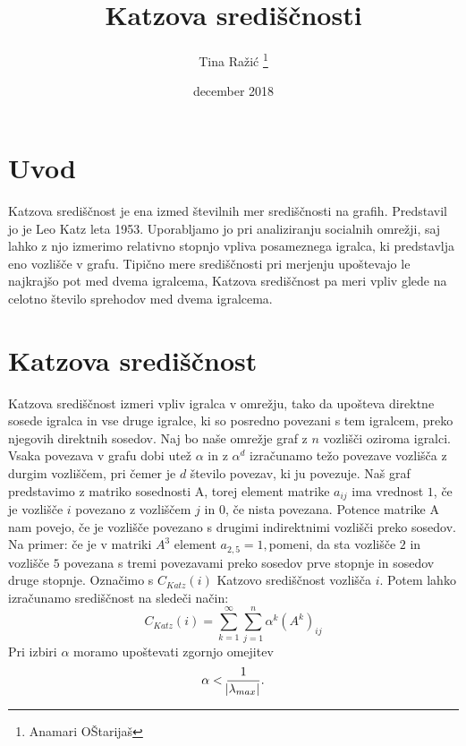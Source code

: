 \documentclass[12pt, letterpaper]{article}
\title{Katzova središčnosti}
\author{Tina Ražić \thanks{Anamari OŠtarijaš}}
\date{december 2018}
\begin{document}
 
\begin{titlepage}
\maketitle
\end{titlepage}

\section{Uvod}
Katzova središčnost je ena izmed številnih mer središčnosti na grafih. Predstavil jo je Leo Katz leta 1953. Uporabljamo jo pri analiziranju socialnih omrežji, saj lahko z njo izmerimo relativno stopnjo vpliva posameznega igralca, ki predstavlja eno vozlišče v grafu. Tipično mere središčnosti pri merjenju upoštevajo le najkrajšo pot med dvema igralcema, Katzova središčnost pa meri vpliv glede na celotno število sprehodov med dvema igralcema. 
 
\section{Katzova središčnost}
Katzova središčnost izmeri vpliv igralca v omrežju, tako da upošteva direktne sosede igralca in vse druge igralce, ki so posredno povezani s tem igralcem, preko njegovih direktnih sosedov. Naj bo naše omrežje graf z $n$ vozlišči oziroma igralci. Vsaka povezava v grafu dobi utež $\alpha$ in z $\alpha^{d}$ izračunamo težo povezave vozlišča z durgim vozliščem, pri čemer je $d$ število povezav, ki ju povezuje. Naš graf predstavimo z matriko sosednosti A, torej element matrike $a_{ij}$ ima vrednost $1$, če je vozlišče $i$ povezano z vozliščem $j$ in $0$, če nista povezana. Potence matrike A nam povejo, če je vozlišče povezano s drugimi indirektnimi vozlišči preko sosedov. Na primer: če je v matriki $A^{3}$ element $a_{2,5}  = 1,$pomeni, da sta vozlišče $2$ in vozlišče $5$ povezana s tremi povezavami preko sosedov prve stopnje in sosedov druge stopnje.
Označimo s $C_{Katz}(i)$ Katzovo središčnost vozlišča $i$. Potem lahko izračunamo središčnost na sledeči način:
$$
C_{Katz}(i) = \sum_{k=1}^{\infty}\sum_{j=1}^{n}\alpha^{k}(A^{k})_{ij}
$$
Pri izbiri $\alpha$ moramo upoštevati zgornjo omejitev $$\alpha < \frac{1}{\abs{\lambda_{max}}}.$$
\end{document}
